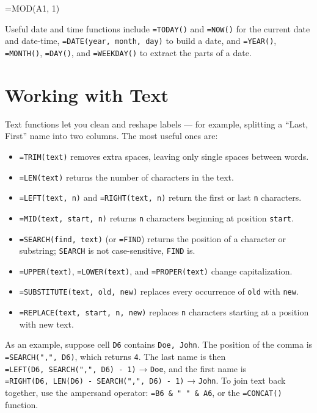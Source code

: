 \documentclass[
  11pt,
  letterpaper,
  DIV=11,
  numbers=noendperiod,
  oneside,
  open=any]{scrreprt}
\newenvironment{Shaded}{\begin{snugshade}}{\end{snugshade}}
\newcommand{\NormalTok}[1]{\textcolor[rgb]{0.00,0.23,0.31}{#1}}
\providecommand{\tightlist}{%
  \setlength{\itemsep}{0pt}\setlength{\parskip}{0pt}}\usepackage{longtable,booktabs,array}
\begin{document}
\begin{Shaded}
\begin{Highlighting}[]
\NormalTok{=MOD(A1, 1)}
\end{Highlighting}
\end{Shaded}

Useful date and time functions include \texttt{=TODAY()} and
\texttt{=NOW()} for the current date and date-time,
\texttt{=DATE(year,\ month,\ day)} to build a date, and
\texttt{=YEAR()}, \texttt{=MONTH()}, \texttt{=DAY()}, and
\texttt{=WEEKDAY()} to extract the parts of a date.

\section{Working with Text}\label{working-with-text}

Text functions let you clean and reshape labels --- for example,
splitting a ``Last, First'' name into two columns. The most useful ones
are:

\begin{itemize}
\tightlist
\item
  \texttt{=TRIM(text)} removes extra spaces, leaving only single spaces
  between words.
\item
  \texttt{=LEN(text)} returns the number of characters in the text.
\item
  \texttt{=LEFT(text,\ n)} and \texttt{=RIGHT(text,\ n)} return the
  first or last \texttt{n} characters.
\item
  \texttt{=MID(text,\ start,\ n)} returns \texttt{n} characters
  beginning at position \texttt{start}.
\item
  \texttt{=SEARCH(find,\ text)} (or \texttt{=FIND}) returns the position
  of a character or substring; \texttt{SEARCH} is not case-sensitive,
  \texttt{FIND} is.
\item
  \texttt{=UPPER(text)}, \texttt{=LOWER(text)}, and
  \texttt{=PROPER(text)} change capitalization.
\item
  \texttt{=SUBSTITUTE(text,\ old,\ new)} replaces every occurrence of
  \texttt{old} with \texttt{new}.
\item
  \texttt{=REPLACE(text,\ start,\ n,\ new)} replaces \texttt{n}
  characters starting at a position with new text.
\end{itemize}

As an example, suppose cell \texttt{D6} contains \texttt{Doe,\ John}.
The position of the comma is \texttt{=SEARCH(",",\ D6)}, which returns
\texttt{4}. The last name is then
\texttt{=LEFT(D6,\ SEARCH(",",\ D6)\ -\ 1)} → \texttt{Doe}, and the
first name is \texttt{=RIGHT(D6,\ LEN(D6)\ -\ SEARCH(",",\ D6)\ -\ 1)} →
\texttt{John}. To join text back together, use the ampersand operator:
\texttt{=B6\ \&\ "\ "\ \&\ A6}, or the \texttt{=CONCAT()} function.
\end{document}
